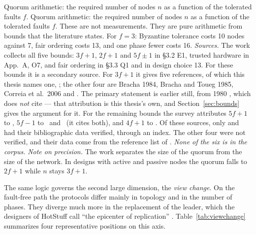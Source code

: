%
{Quorum arithmetic: the required number of nodes $n$ as a function of the
tolerated faults $f$.}%
{Quorum arithmetic: the required number of nodes $n$ as a function of the
tolerated faults $f$. These are not measurements. They are pure
arithmetic from bounds that the literature states. For $f=3$: Byzantine
tolerance costs 10 nodes against 7, fair ordering costs 13, and one phase
fewer costs 16. \emph{Sources.} The work \cite{amiri2024bedrock} collects
all five bounds: $3f{+}1$, $2f{+}1$ and $5f{\pm}1$ in \S3.2 E1, trusted
hardware in App.~A, O7, and fair ordering in \S3.3 Q1 and in design
choice 13. For these bounds it is a secondary source. For $3f{+}1$ it
gives five references, of which this thesis names one,
\cite{lamport1982byzantine}; the other four are Bracha 1984, Bracha and
Toueg 1985, Correia et al.\ 2006 and \cite{dwork1988consensus}. The
primary statement is earlier still, from 1980 \cite{pease1980reaching},
which \cite{amiri2024bedrock} does \emph{not} cite --- that attribution
is this thesis's own, and Section~\ref{sec:bounds} gives the argument
for it. For the remaining bounds the survey attributes $5f{+}1$ to
\cite{martin2006fab}\unver, $5f{-}1$ to \cite{kuznetsov2021optimal}\unver\
and \cite{abraham2021goodcase}\unver\ (it cites both), and $4f{+}1$ to
\cite{kelkar2020orderfairness}\unver. Of these sources, only
\cite{pease1980reaching} and \cite{lamport1982byzantine} had their
bibliographic data verified, through an index. The other four were not
verified, and their data come from the reference list of
\cite{amiri2024bedrock}. \emph{None of the six is in the corpus.}
\emph{Note on precision.} The work \cite{amiri2024bedrock} separates the
size of the quorum from the size of the network. In designs with active
and passive nodes the quorum falls to $2f{+}1$ while $n$ stays
$3f{+}1$.}%
{}

The same logic governs the second large dimension, the \emph{view
change}. On the fault-free path the protocols differ mainly in topology
and in the number of phases. They diverge much more in the replacement of
the leader, which the designers of HotStuff call \enquote{the epicenter
of replication} \cite{yin2019hotstuff}. Table~\ref{tab:viewchange}
summarizes four representative positions on this axis.


